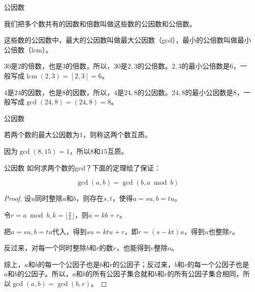 \documentclass{ctexbeamer}        %
\newcommand{\lcm}{\operatorname{lcm}}
\begin{document}
\begin{frame}{公因数}

\begin{definition}[公因数和公倍数]
    我们把多个数共有的因数和倍数叫做这些数的公因数和公倍数。

    这些数的公因数中，最大的公因数叫做最大公因数（gcd），最小的公倍数叫做最小公倍数（lcm）。
\end{definition}

\begin{example}
    $30$是$2$的倍数，也是$3$的倍数，所以，$30$是$2,3$的公倍数。$2,3$的最小公倍数是$6$，一般写成$\lcm(2,3)=[2,3]=6$。

    $4$是$24$的因数，也是$8$的因数，所以，$4$是$24,8$的公因数。$24,8$的最小公因数是$8$，一般写成$\gcd(24,8)=(24,8)=8$。
\end{example}

\end{frame}

\begin{frame}{公因数}

\begin{definition}[互质]
    若两个数的最大公因数为$1$，则称这两个数互质。
\end{definition}

\begin{example}
    因为$\gcd(8,15)=1$，所以$8$和$15$互质。
\end{example}

\end{frame}

\begin{frame}{公因数}
如何求两个数的gcd？下面的定理给了保证：

\begin{theorem}[辗转相除法]
    $$\gcd(a,b)=\gcd(b,a \bmod b)$$
\end{theorem}
\pause
\begin{proof}
    设$u$同时整除$a$和$b$，则存在$s,t$，使得$a=su,b=tu$。

    令$r = a \bmod b, k = \lfloor \frac{a}{b} \rfloor$，则$a=kb+r$。

    把$a=su,b=tu$代入，得到$su=ktu+r$，即$r=(s-kt)u$，得到$u$也整除$r$。

    反过来，对每一个同时整除$b$和$r$的数$v$，也能得到$v$整除$a$。

    综上，$a$和$b$的每一个公因子也是$b$和$r$的公因子；反过来，$b$和$r$的每一个公因子也是$a$和$b$的公因子。所以，$a$和$b$的所有公因子集合就和$b$和$r$的所有公因子集合相同，所以$\gcd(a,b)=\gcd(b,r)$。
\end{proof}

\end{frame}
\end{document}
